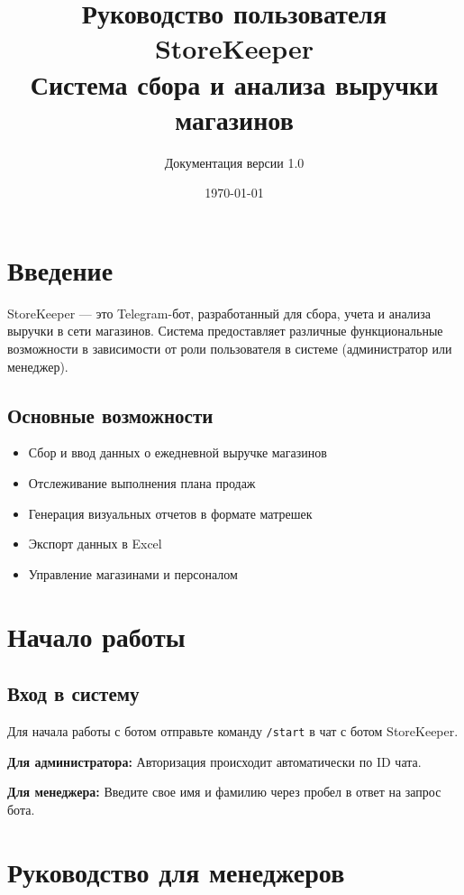\documentclass[a4paper,12pt]{article}
\title{\textbf{Руководство пользователя}\\
{\huge StoreKeeper}\\
Система сбора и анализа выручки магазинов}
\author{Документация версии 1.0}
\date{\today}
\begin{document}
\maketitle
\thispagestyle{empty}
\tableofcontents
\newpage

\section{Введение}

StoreKeeper — это Telegram-бот, разработанный для сбора, учета и анализа выручки в сети магазинов. Система предоставляет различные функциональные возможности в зависимости от роли пользователя в системе (администратор или менеджер).

\subsection{Основные возможности}
\begin{itemize}
    \item Сбор и ввод данных о ежедневной выручке магазинов
    \item Отслеживание выполнения плана продаж
    \item Генерация визуальных отчетов в формате матрешек
    \item Экспорт данных в Excel
    \item Управление магазинами и персоналом
\end{itemize}

\section{Начало работы}

\subsection{Вход в систему}
Для начала работы с ботом отправьте команду \texttt{/start} в чат с ботом StoreKeeper.

\begin{tcolorbox}[colback=gray!10, title=Авторизация]
\textbf{Для администратора:} Авторизация происходит автоматически по ID чата.

\textbf{Для менеджера:} Введите свое имя и фамилию через пробел в ответ на запрос бота.
\end{tcolorbox}

\section{Руководство для менеджеров}
\end{document}
